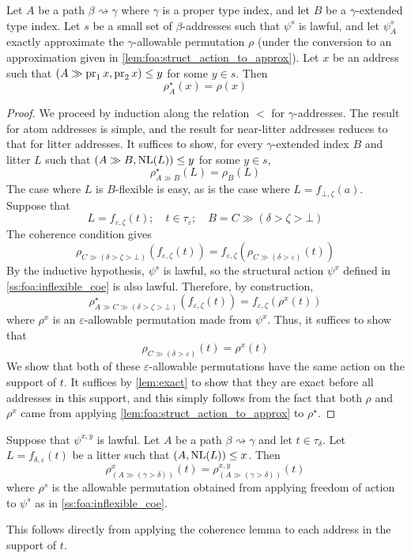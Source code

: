 \begin{lemma}
    Let \( A \) be a path \( \beta \rightsquigarrow \gamma \) where \( \gamma \) is a proper type index, and let \( B \) be a \( \gamma \)-extended type index.
    Let \( s \) be a small set of \( \beta \)-addresses such that \( \psi^s \) is lawful, and let \( \psi^s_A \) exactly approximate the \( \gamma \)-allowable permutation \( \rho \) (under the conversion to an approximation given in \cref{lem:foa:struct_action_to_approx}).
    Let \( x \) be an address such that \( (A \gg \operatorname{pr}_1 x, \operatorname{pr}_2 x) \leq y \) for some \( y \in s \).
    Then
    \[ \rho^\star_A(x) = \rho(x) \]
\end{lemma}
\begin{proof}
    We proceed by induction along the relation \( < \) for \( \gamma \)-addresses.
    The result for atom addresses is simple, and the result for near-litter addresses reduces to that for litter addresses.
    It suffices to show, for every \( \gamma \)-extended index \( B \) and litter \( L \) such that \( (A \gg B, \operatorname{NL}(L)) \leq y \) for some \( y \in s \),
    \[ \rho^\star_{A \gg B}(L) = \rho_B(L) \]
    The case where \( L \) is \( B \)-flexible is easy, as is the case where \( L = f_{\bot,\zeta}(a) \).
    Suppose that
    \[ L = f_{\varepsilon,\zeta}(t);\quad t \in \tau_\varepsilon;\quad B = C \gg (\delta > \zeta > \bot) \]
    The coherence condition gives
    \[ \rho_{C \gg (\delta > \zeta > \bot)}(f_{\varepsilon,\zeta}(t)) = f_{\varepsilon,\zeta}(\rho_{C \gg (\delta > \varepsilon)}(t)) \]
    By the inductive hypothesis, \( \psi^s \) is lawful, so the structural action \( \psi^x \) defined in \cref{ss:foa:inflexible_coe} is also lawful.
    Therefore, by construction,
    \[ \rho^\star_{A \gg C \gg (\delta > \zeta > \bot)}(f_{\varepsilon,\zeta}(t)) = f_{\varepsilon,\zeta}(\rho^x(t)) \]
    where \( \rho^x \) is an \( \varepsilon \)-allowable permutation made from \( \psi^x \).
    Thus, it suffices to show that
    \[ \rho_{C \gg (\delta > \varepsilon)}(t) = \rho^x(t) \]
    We show that both of these \( \varepsilon \)-allowable permutations have the same action on the support of \( t \).
    It suffices by \cref{lem:exact} to show that they are exact before all addresses in this support, and this simply follows from the fact that both \( \rho \) and \( \rho^x \) came from applying \cref{lem:foa:struct_action_to_approx} to \( \rho^\star \).
\end{proof}

\begin{corollary}
    \label{cor:foa_both}
    Suppose that \( \psi^{x,y} \) is lawful.
    Let \( A \) be a path \( \beta \rightsquigarrow \gamma \) and let \( t \in \tau_\delta \).
    Let \( L = f_{\delta,\varepsilon}(t) \) be a litter such that \( (A, \operatorname{NL}(L)) \leq x \).
    Then
    \[ \rho^x_{(A \gg (\gamma > \delta))}(t) = \rho^{x,y}_{(A \gg (\gamma > \delta))}(t) \]
    where \( \rho^s \) is the allowable permutation obtained from applying freedom of action to \( \psi^s \) as in \cref{ss:foa:inflexible_coe}.
\end{corollary}
This follows directly from applying the coherence lemma to each address in the support of \( t \).


